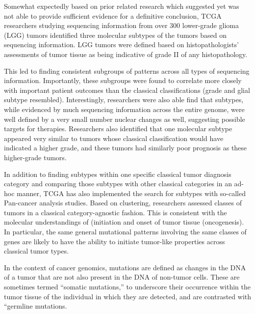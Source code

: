         Somewhat expectedly based on prior related research which suggested
        yet was not able to provide sufficient evidence for a definitive
        conclusion, TCGA researchers studying sequencing information from over
        300 lower-grade glioma (LGG) tumors identified three molecular
        subtypes of the tumors based on sequencing information. LGG tumors
        were defined based on histopathologists’ assessments of tumor tissue
        as being indicative of grade II of any histopathology.


        This led to finding consistent subgroups of patterns across
        all types of  sequencing information. Importantly, these
        subgroups were found to correlate more closely with important
        patient outcomes than the classical classifications (grade and
        glial subtype resembled). Interestingly, researchers were also
        able find that subtypes, while evidenced by much sequencing
        information across the entire genome, were well defined by a
        very small number nuclear changes as well, suggesting possible
        targets for therapies. Researchers also identified that one
        molecular subtype appeared very similar to tumors whose
        classical classification would have indicated a higher grade,
        and these tumors had similarly poor prognosis as these
        higher-grade tumors.


        

        In addition to finding subtypes within one specific classical tumor
        diagnosis category and comparing those subtypes with other classical
        categories in an ad-hoc manner, TCGA has also implemented the search
        for subtypes with so-called Pan-cancer analysis\cite{weinstein_cancer_2013} studies. Based on
        clustering, researchers assessed classes of tumors in a classical
        category-agnostic fashion. This is consistent with the molecular
        understandings of (initiation and onset of tumor tissue
        (oncogenesis). In particular, the same general mutational patterns
        involving the same classes of genes are likely to have the ability to
        initiate tumor-like properties across classical tumor
        types.

        In the context of cancer genomics, mutations are defined as changes in the DNA of a
        tumor that are not also present in the DNA of non-tumor
        cells. These are sometimes termed ``somatic mutations,'' to
        underscore their occurrence within the tumor tissue of the
        individual in which they are detected, and are contrasted with
        ``germline mutations.


